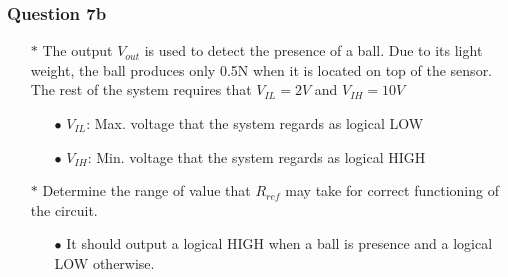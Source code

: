 \documentclass{beamer}
\begin{document}
\begin{frame}
\frametitle{Question 7b}
\begin{itemize} \itemsep1pt \parskip0pt 
  \item[$\ast$] The output $V_{out}$ is used to detect the presence of a ball. Due to its light weight, the ball produces only 0.5N when it is located on top of the sensor. The rest of the system requires that $V_{IL} = 2V$ and $V_{IH} = 10V$
  \begin{itemize} \itemsep1pt \parskip0pt 
  \item[$\bullet$] $V_{IL}$: Max. voltage that the system regards as logical LOW
  \item[$\bullet$] $V_{IH}$: Min. voltage that the system regards as logical HIGH
  \end{itemize}

  \item[$\ast$] Determine the range of value that $R_{ref}$ may take for correct functioning of the circuit.
  \begin{itemize} \itemsep1pt \parskip0pt 
  \item[$\bullet$] It should output a logical HIGH when a ball is presence and a logical LOW otherwise.
  \end{itemize}
\end{itemize}
\begin{columns}


\end{columns}

\end{frame}

\end{document}
